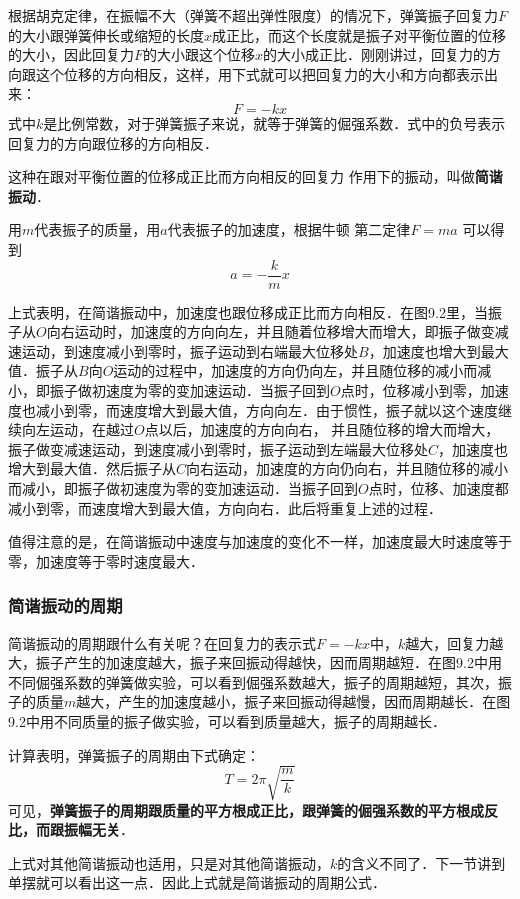 根据胡克定律，在振幅不大（弹簧不超出弹性限度）的情况下，弹簧振子回复力$F$的大小跟弹簧伸长或缩短的长度$x$成正比，而这个长度就是振子对平衡位置的位移的大小，因此回复力$F$的大小跟这个位移$x$的大小成正比．刚刚讲过，回复力的方向跟这个位移的方向相反，这样，用下式就可以把回复力的大小和方向都表示出来：
\[F=-kx\]
式中$k$是比例常数，对于弹簧振子来说，就等于弹簧的倔强系数．式中的负号表示回复力的方向跟位移的方向相反．

这种在跟对平衡位置的位移成正比而方向相反的回复力
作用下的振动，叫做\textbf{简谐振动}．

用$m$代表振子的质量，用$a$代表振子的加速度，根据牛顿
第二定律$F=ma$ 可以得到
\[a=-\frac{k}{m}x\]

上式表明，在简谐振动中，加速度也跟位移成正比而方向相反．在图9.2里，当振子从$O$向右运动时，加速度的方向向左，并且随着位移增大而增大，即振子做变减速运动，到速度减小到零时，振子运动到右端最大位移处$B$，加速度也增大到最大值．振子从$B$向$O$运动的过程中，加速度的方向仍向左，并且随位移的减小而减小，即振子做初速度为零的变加速运动．当振子回到$O$点时，位移减小到零，加速度也减小到零，而速度增大到最大值，方向向左．由于惯性，振子就以这个速度继续向左运动，在越过$O$点以后，加速度的方向向右，
并且随位移的增大而增大，振子做变减速运动，到速度减小到零时，振子运动到左端最大位移处$C$，加速度也增大到最大值．然后振子从$C$向右运动，加速度的方向仍向右，并且随位移的减小而减小，即振子做初速度为零的变加速运动．当振子回到$O$点时，位移、加速度都减小到零，而速度增大到最大值，方向向右．此后将重复上述的过程．

值得注意的是，在简谐振动中速度与加速度的变化不一样，加速度最大时速度等于零，加速度等于零时速度最大．

\subsubsection{简谐振动的周期}

简谐振动的周期跟什么有关呢？在回复力的表示式$F=-kx$中，$k$越大，回复力越大，振子产生的加速度越大，振子来回振动得越快，因而周期越短．在图9.2中用不同倔强系数的弹簧做实验，可以看到倔强系数越大，振子的周期越短，其次，振子的质量$m$越大，产生的加速度越小，振子来回振动得越慢，因而周期越长．在图9.2中用不同质量的振子做实验，可以看到质量越大，振子的周期越长．

计算表明，弹簧振子的周期由下式确定：
\[T=2\pi\sqrt{\frac{m}{k}} \]
可见，\textbf{弹簧振子的周期跟质量的平方根成正比，跟弹簧的倔强系数的平方根成反比，而跟振幅无关}．

上式对其他简谐振动也适用，只是对其他简谐振动，$k$的含义不同了．下一节讲到单摆就可以看出这一点．因此上式就是简谐振动的周期公式．

